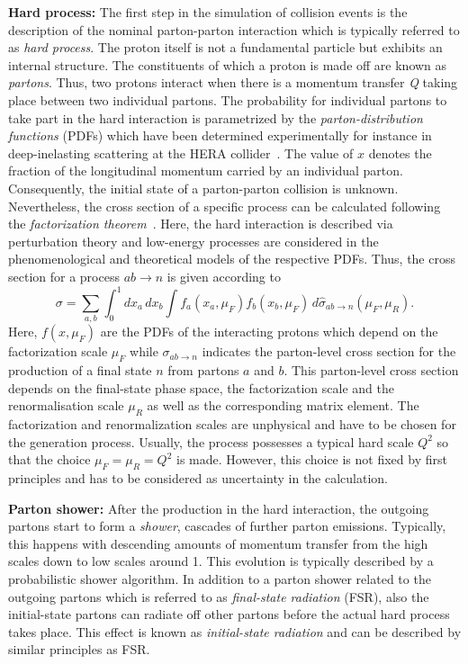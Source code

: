 \begin{description} 
 \item \textbf{Hard process:} The first step in the simulation of collision events is the description of the nominal parton-parton interaction which is typically referred to as \textit{hard process}. The proton itself is not a fundamental particle but exhibits an internal structure. The constituents of which a proton is made off are known as \textit{partons}. Thus, two protons interact when there is a momentum transfer \textit{Q} taking place between two individual partons. The probability for individual partons to take part in the hard interaction is parametrized by the \textit{parton-distribution functions} (PDFs) which have been determined experimentally for instance in deep-inelasting scattering at the HERA collider~\cite{bib:CombinedHERA:2009wt}. The value of $x$ denotes the fraction of the longitudinal momentum carried by an individual parton. Consequently, the initial state of a parton-parton collision is unknown. Nevertheless, the cross section of a specific process can be calculated following the \textit{factorization theorem}~\cite{Collins:1987pm, Collins:1989gx}. Here, the hard interaction is described via perturbation theory and low-energy processes are considered in the phenomenological and theoretical models of the respective PDFs. Thus, the cross section for a process $ab \rightarrow n$ is given according to
\begin{equation}
 \sigma = \sum_{a,b} \int_{0}^{1} dx_{a} \, dx_{b} \int f_{a}(x_{a}, \mu_{F}) f_{b}(x_{b}, \mu_{F}) \, d\hat{\sigma}_{ab \rightarrow n} (\mu_{F}, \mu_{R}). 
\end{equation}
Here, $f(x, \mu_{F})$ are the PDFs of the interacting protons which depend on the factorization scale $\mu_{F}$ while $\sigma_{ab \rightarrow n}$ indicates the parton-level cross section for the production of a final state $n$ from partons $a$ and $b$. This parton-level cross section depends on the final-state phase space, the factorization scale and the renormalisation scale $\mu_{R}$ as well as the corresponding matrix element. The factorization and renormalization scales are unphysical and have to be chosen for the generation process. Usually, the process possesses a typical hard scale $Q^{2}$ so that the choice $\mu_{F} = \mu_{R} = Q^{2}$ is made. However, this choice is not fixed by first principles and has to be considered as uncertainty in the calculation.
\item \textbf{Parton shower:} After the production in the hard interaction, the outgoing partons start to form a \textit{shower}, \ie cascades of further parton emissions. Typically, this happens with descending amounts of momentum transfer from the high scales down to low scales around 1\gev. This evolution is typically described by a probabilistic shower algorithm. In addition to a parton shower related to the outgoing partons which is referred to as \textit{final-state radiation} (FSR), also the initial-state partons can radiate off other partons before the actual hard process takes place. This effect is known as \textit{initial-state radiation} and can be described by similar principles as FSR. 

\end{description}

